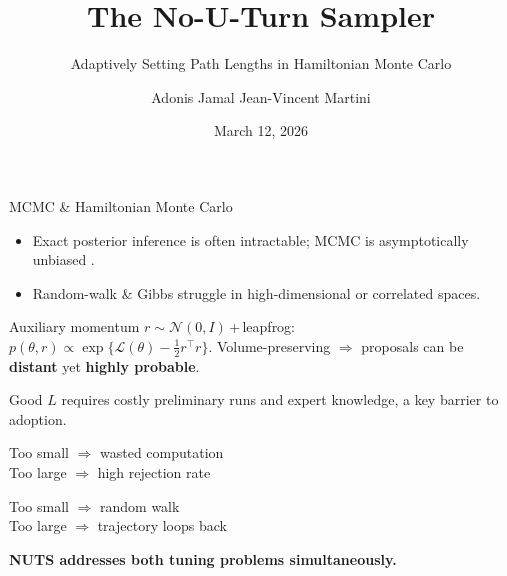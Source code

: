 \documentclass{beamer}
\title{The No-U-Turn Sampler}
\subtitle{Adaptively Setting Path Lengths in Hamiltonian Monte Carlo}
\author{Adonis Jamal \quad Jean-Vincent Martini}
\institute{\'Ecole Normale Sup\'erieure Paris-Saclay --- MVA 2025--2026}
\date{March 12, 2026}
\begin{document}
\maketitle

\begin{frame}{MCMC \& Hamiltonian Monte Carlo}
    \small
    \vspace{-0.4cm}
    \begin{itemize}\setlength\itemsep{1pt}
        \item Exact posterior inference is often intractable; MCMC is asymptotically unbiased \cite{neal1993probabilistic}.
        \item Random-walk \& Gibbs \cite{metropolis1953equation,geman1984stochastic} struggle in high-dimensional or correlated spaces.
    \end{itemize}

    \vspace{-0.1cm}
    \begin{tcolorbox}[keybox, title=Hamiltonian Monte Carlo]
        \small Auxiliary momentum $r \!\sim\! \mathcal{N}(0,I)$\,+\,leapfrog: \\
        $p(\theta,r)\!\propto\!\exp\!\bigl\{\mathcal{L}(\theta)-\tfrac{1}{2}r^\top r\bigr\}$.
        Volume-preserving $\Rightarrow$ proposals can be \textbf{distant} yet \textbf{highly probable}.
    \end{tcolorbox}

      Good $L$ requires costly preliminary runs and expert knowledge, a key barrier to adoption.

    \vspace{-0.1cm}
    \noindent
    \begin{minipage}[t]{0.49\textwidth}
      \begin{tcolorbox}[warnbox, title=Step size $\varepsilon$]
        \footnotesize
        Too small $\Rightarrow$ wasted computation\\[2pt]
        Too large $\Rightarrow$ high rejection rate
      \end{tcolorbox}
    \end{minipage}
    \hfill
    \begin{minipage}[t]{0.49\textwidth}
      \begin{tcolorbox}[warnbox, title=Leapfrog steps $L$]
        \footnotesize
        Too small $\Rightarrow$ random walk \\[2pt]
        Too large $\Rightarrow$ trajectory loops back
      \end{tcolorbox}
    \end{minipage}
    \vspace*{-0.1cm}
    {\small \textbf{NUTS addresses both tuning problems simultaneously.}}
\end{frame}
\end{document}
